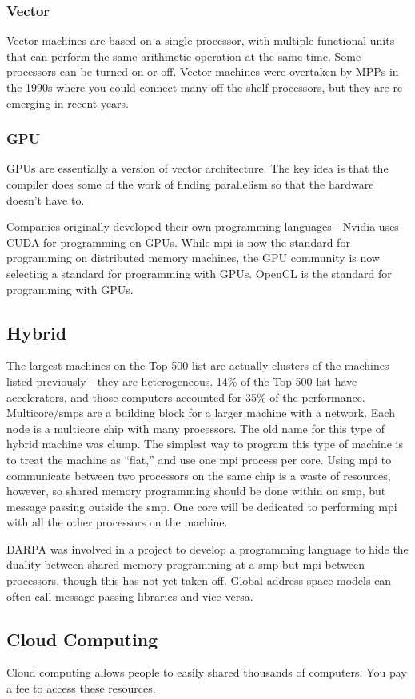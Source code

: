 \documentclass[10pt]{article}
\begin{document}
\begin{flushleft}
\subsubsection{Vector}

Vector machines are based on a single processor, with multiple functional units that can perform the same arithmetic operation at the same time. Some processors can be turned on or off. Vector machines were overtaken by MPPs in the 1990s where you could connect many off-the-shelf processors, but they are re-emerging in recent years. 

\subsubsection{GPU}

GPUs are essentially a version of vector architecture. The key idea is that the compiler does some of the work of finding parallelism so that the hardware doesn't have to. 

Companies originally developed their own programming languages - Nvidia uses CUDA for programming on GPUs. While \gls{mpi} is now the standard for programming on distributed memory machines, the GPU community is now selecting a standard for programming with GPUs. OpenCL is the standard for programming with GPUs. 

\subsection{Hybrid}

The largest machines on the Top 500 list are actually clusters of the machines listed previously - they are heterogeneous. 14\% of the Top 500 list have accelerators, and those computers accounted for 35\% of the performance. Multicore/\gls{smp}s are a building block for a larger machine with a network. Each node is a multicore chip with many processors. The old name for this type of hybrid machine was \gls{clump}. The simplest way to program this type of machine is to treat the machine as ``flat,'' and use one \gls{mpi} process per core. Using \gls{mpi} to communicate between two processors on the same chip is a waste of resources, however, so shared memory programming should be done within on \gls{smp}, but message passing outside the \gls{smp}. One core will be dedicated to performing \gls{mpi} with all the other processors on the machine. 

DARPA was involved in a project to develop a programming language to hide the duality between shared memory programming at a \gls{smp} but \gls{mpi} between processors, though this has not yet taken off. Global address space models can often call message passing libraries and vice versa. 

\subsection{Cloud Computing}

Cloud computing allows people to easily shared thousands of computers. You pay a fee to access these resources.

\end{flushleft}
\end{document}
